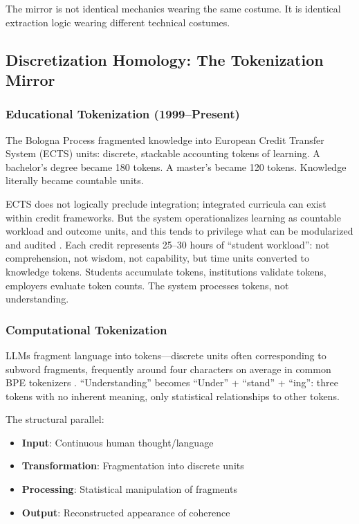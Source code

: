 The mirror is not identical mechanics wearing the same costume. It is identical extraction logic wearing different technical costumes.

\subsection{Discretization Homology: The Tokenization Mirror}

\subsubsection{Educational Tokenization (1999--Present)}

The Bologna Process fragmented knowledge into European Credit Transfer System (ECTS) units: discrete, stackable accounting tokens of learning. A bachelor's degree became 180 tokens. A master's became 120 tokens. Knowledge literally became countable units.

ECTS does not logically preclude integration; integrated curricula can exist within credit frameworks. But the system operationalizes learning as countable workload and outcome units, and this tends to privilege what can be modularized and audited \citep{ects2015}. Each credit represents 25--30 hours of ``student workload'': not comprehension, not wisdom, not capability, but time units converted to knowledge tokens. Students accumulate tokens, institutions validate tokens, employers evaluate token counts. The system processes tokens, not understanding.

\subsubsection{Computational Tokenization}

LLMs fragment language into tokens---discrete units often corresponding to subword fragments, frequently around four characters on average in common BPE tokenizers \citep{sennrich2016}. ``Understanding'' becomes ``Under'' + ``stand'' + ``ing'': three tokens with no inherent meaning, only statistical relationships to other tokens.

The structural parallel:
\begin{itemize}
\item \textbf{Input}: Continuous human thought/language
\item \textbf{Transformation}: Fragmentation into discrete units
\item \textbf{Processing}: Statistical manipulation of fragments
\item \textbf{Output}: Reconstructed appearance of coherence
\end{itemize}

